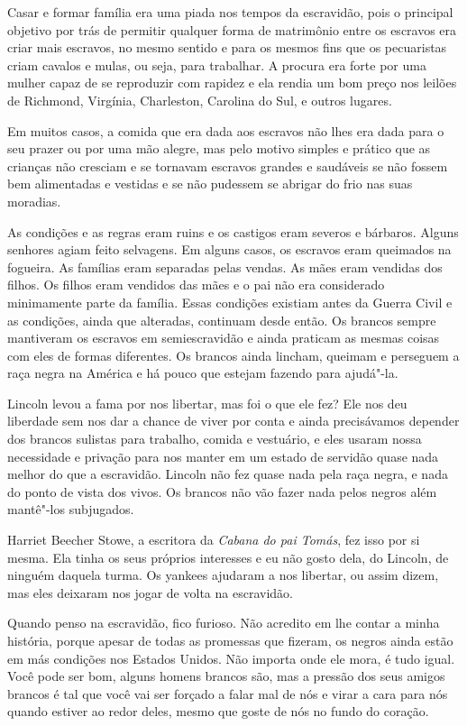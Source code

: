 Casar e formar família era uma piada nos tempos da escravidão, pois o
principal objetivo por trás de permitir qualquer forma de matrimônio
entre os escravos era criar mais escravos, no mesmo sentido e para os
mesmos fins que os pecuaristas criam cavalos e mulas, ou seja, para
trabalhar. A procura era forte por uma mulher capaz de se reproduzir com
rapidez e ela rendia um bom preço nos leilões de Richmond, Virgínia,
Charleston, Carolina do Sul, e outros lugares.

Em muitos casos, a comida que era dada aos escravos não lhes era dada
para o seu prazer ou por uma mão alegre, mas pelo motivo simples e
prático que as crianças não cresciam e se tornavam escravos grandes e
saudáveis se não fossem bem alimentadas e vestidas e se não pudessem se
abrigar do frio nas suas moradias.

As condições e as regras eram ruins e os castigos eram severos e
bárbaros. Alguns senhores agiam feito selvagens. Em alguns casos, os
escravos eram queimados na fogueira. As famílias eram separadas pelas
vendas. As mães eram vendidas dos filhos. Os filhos eram vendidos das
mães e o pai não era considerado minimamente parte da família. Essas
condições existiam antes da Guerra Civil e as condições, ainda que
alteradas, continuam desde então. Os brancos sempre mantiveram os
escravos em semiescravidão e ainda praticam as mesmas coisas com eles de
formas diferentes. Os brancos ainda lincham, queimam e perseguem a raça
negra na América e há pouco que estejam fazendo para ajudá"-la.

Lincoln levou a fama por nos libertar, mas foi o que ele fez? Ele nos
deu liberdade sem nos dar a chance de viver por conta e ainda
precisávamos depender dos brancos sulistas para trabalho, comida e
vestuário, e eles usaram nossa necessidade e privação para nos manter em
um estado de servidão quase nada melhor do que a escravidão. Lincoln não
fez quase nada pela raça negra, e nada do ponto de vista dos vivos. Os
brancos não vão fazer nada pelos negros além mantê"-los subjugados.

Harriet Beecher Stowe, a escritora da \emph{Cabana do pai Tomás}, fez
isso por si mesma. Ela tinha os seus próprios interesses e eu não gosto
dela, do Lincoln, de ninguém daquela turma. Os yankees ajudaram a nos
libertar, ou assim dizem, mas eles deixaram nos jogar de volta na
escravidão.

Quando penso na escravidão, fico furioso. Não acredito em lhe contar a
minha história, porque apesar de todas as promessas que fizeram, os
negros ainda estão em más condições nos Estados Unidos. Não importa onde
ele mora, é tudo igual. Você pode ser bom, alguns homens brancos são,
mas a pressão dos seus amigos brancos é tal que você vai ser forçado a
falar mal de nós e virar a cara para nós quando estiver ao redor deles,
mesmo que goste de nós no fundo do coração.

